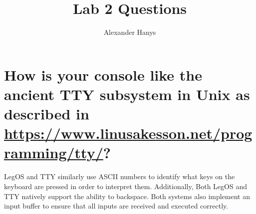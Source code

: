 \documentclass{article}
\title{Lab 2 Questions}
\author{Alexander Hanys}
\begin{document}
\maketitle


\section{How is your console like the ancient TTY subsystem in Unix as described in
\href{https://www.linusakesson.net/programming/tty/}{https://www.linusakesson.net/programming/tty/}?}

LegOS and TTY similarly use ASCII numbers to identify what keys on the keyboard are pressed in order to interpret them. Additionally, Both LegOS and TTY natively support the ability to backspace. Both systems also implement an input buffer to ensure that all inputs are received and executed correctly.
\end{document}
